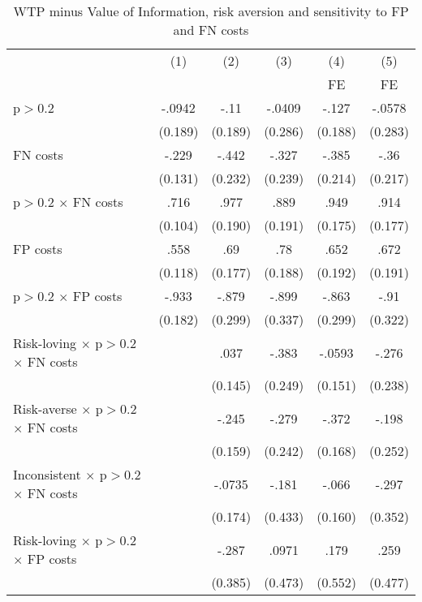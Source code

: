 \begin{table}[htbp]\centering
\caption{WTP minus Value of Information, risk aversion and sensitivity to FP and FN costs}
\begin{tabular}{l*{5}{c}}
\hline\hline
                &\multicolumn{1}{c}{(1)}&\multicolumn{1}{c}{(2)}&\multicolumn{1}{c}{(3)}&\multicolumn{1}{c}{(4)}&\multicolumn{1}{c}{(5)}\\
                &\multicolumn{1}{c}{}&\multicolumn{1}{c}{}&\multicolumn{1}{c}{}&\multicolumn{1}{c}{FE}&\multicolumn{1}{c}{FE}\\
\hline
p$>$0.2         &   -.0942&     -.11&   -.0409&    -.127&   -.0578\\
                &  (0.189)&  (0.189)&  (0.286)&  (0.188)&  (0.283)\\
FN costs        &    -.229&    -.442&    -.327&    -.385&     -.36\\
                &  (0.131)&  (0.232)&  (0.239)&  (0.214)&  (0.217)\\
p$>$0.2 $\times$ FN costs&     .716&     .977&     .889&     .949&     .914\\
                &  (0.104)&  (0.190)&  (0.191)&  (0.175)&  (0.177)\\
FP costs        &     .558&      .69&      .78&     .652&     .672\\
                &  (0.118)&  (0.177)&  (0.188)&  (0.192)&  (0.191)\\
p$>$0.2 $\times$ FP costs&    -.933&    -.879&    -.899&    -.863&     -.91\\
                &  (0.182)&  (0.299)&  (0.337)&  (0.299)&  (0.322)\\
Risk-loving $\times$ p$>$0.2 $\times$ FN costs&         &     .037&    -.383&   -.0593&    -.276\\
                &         &  (0.145)&  (0.249)&  (0.151)&  (0.238)\\
Risk-averse $\times$ p$>$0.2 $\times$ FN costs&         &    -.245&    -.279&    -.372&    -.198\\
                &         &  (0.159)&  (0.242)&  (0.168)&  (0.252)\\
Inconsistent $\times$ p$>$0.2 $\times$ FN costs&         &   -.0735&    -.181&    -.066&    -.297\\
                &         &  (0.174)&  (0.433)&  (0.160)&  (0.352)\\
Risk-loving $\times$ p$>$0.2 $\times$ FP costs&         &    -.287&    .0971&     .179&     .259\\
                &         &  (0.385)&  (0.473)&  (0.552)&  (0.477)\\

\end{tabular}
\end{table}
